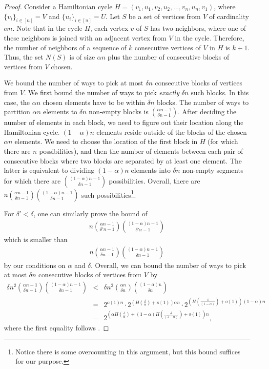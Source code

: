 \documentclass{toc}
\theoremstyle{plain}
\begin{document}
\begin{proof}
  Consider a Hamiltonian cycle $H=(v_1,u_1,v_2,u_2,\ldots, v_n,u_n,v_1)$, where $\{v_i\}_{i\in [n]}=V$ and $\{u_i\}_{i\in [n]}=U$. Let $S$ be
%
a  %
set of vertices from $V$ of cardinality $\alpha n$. Note that in the cycle $H$, each vertex $v$ of $S$ has two neighbors, where one of these neighbors is joined with  an adjacent vertex from $V$ in the cycle. Therefore, the number of neighbors of a sequence of $k$ consecutive vertices of $V$ in $H$ is $k+1$. Thus, the set $N(S)$ is of size $\alpha n$ plus the number of consecutive blocks of vertices from $V$ chosen.
	
	We bound the number of ways to pick at most $\delta n$ consecutive blocks of vertices from $V$. We first bound the number of ways to pick \emph{exactly} $\delta n$ such blocks.
	In this case, the $\alpha n$ chosen elements have to be within $\delta n$ blocks. The number of ways to partition $\alpha n$ elements to $\delta n$
non-empty %
blocks is $\binom{\alpha n - 1}{\delta n - 1}$. After deciding the number of elements in each block, we need to figure out their  location along the Hamiltonian cycle. $(1-\alpha)n$ elements reside outside of the blocks of 
the  %
chosen $\alpha n$ elements. We need to %
choose  %
the location of the first block in $H$ (for which there are $n$ possibilities), and then the number of %
elements   %
%
between each pair of consecutive blocks %
where two blocks are separated by at least one element. The latter is equivalent to %
%
dividing %
$(1-\alpha)n$ elements into $\delta n$ 
non-empty  %
%
%
segments   %
for which there are $\binom{(1-\alpha)n-1}{\delta n - 1}$ possibilities. Overall, there are $n\binom{\alpha n - 1}{\delta n - 1}\binom{(1-\alpha)n-1}{\delta n - 1}$ such possibilities\footnote{Notice
%
%
there is  %
some %
overcounting  %
in this argument, but this bound suffices for our purpose.}.
	
	For $\delta'< \delta$, one can similarly prove the bound of 
	\begin{eqnarray}
		n\binom{\alpha n - 1}{\delta' n - 1}\binom{(1-\alpha)n-1}{\delta' n - 1}
	\end{eqnarray}
	which is smaller than 
	\begin{eqnarray}
		n\binom{\alpha n - 1}{\delta n - 1}\binom{(1-\alpha)n-1}{\delta n - 1}
	\end{eqnarray} by our conditions on $\alpha$ and $\delta$. Overall, we can bound the number of ways to pick at most $\delta n$ consecutive blocks of vertices from $V$ by
	\begin{eqnarray}
		\delta n^2\binom{\alpha n - 1}{\delta n - 1}\binom{(1-\alpha)n-1}{\delta n - 1} & < & \delta n^2\binom{\alpha n}{\delta n}\binom{(1-\alpha)n}{\delta n}\\
		&=& 2^{o(1)n}\cdot 2^{(H(\frac{\delta}{ \alpha})+o(1))\alpha n}\cdot 2^{(H(\frac{\delta} {(1-\alpha)})+o(1))(1-\alpha) n}\\
		& = &2^{(\alpha H(\frac{\delta}{ \alpha})+(1-\alpha)H(\frac{\delta} {(1-\alpha)})+o(1))n},
	\end{eqnarray}
	where the first equality follows .
\end{proof}
\end{document}
